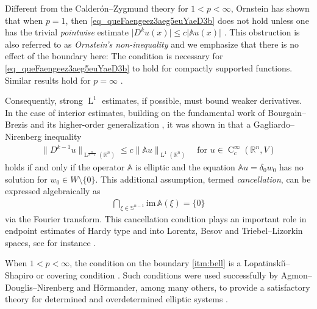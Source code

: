 \documentclass[a4paper,10pt]{amsart}
\newcommand{\R}{\mathbb R}
\renewcommand{\leq}{\leqslant}
\newcommand{\lebe}{\operatorname{L}}
\newcommand{\hold}{\operatorname{C}}
\newcommand{\A}{\mathbb{A}}
\numberwithin{equation}{section}
\theoremstyle{remark}
\numberwithin{equation}{section}
\begin{document}
	Different from the Calder\'{o}n--Zygmund theory  \cite{CalderonZygmund,CalderonZygmund1} for $1<p<\infty$, Ornstein has shown that when $p=1$, then \eqref{eq_queFaengeez3aeg5euYaeD3b} does  not hold unless one has the trivial \emph{pointwise} estimate \(\lvert D^k u (x)\rvert  \leq c \lvert \A u (x)\rvert\) \cite{Ornstein,KK,FG}. This obstruction is also referred to as \emph{Ornstein's non-inequality} and we  emphasize that there is no effect of the boundary here: The condition is necessary for \eqref{eq_queFaengeez3aeg5euYaeD3b} to hold for compactly supported functions. Similar results hold for $p=\infty$ \cite{Mityagin,dLM}.
	
	Consequently, strong $\lebe^1$ estimates, if possible, must bound weaker derivatives. In the case of interior estimates, building on the fundamental work of Bourgain--Brezis \cite{BB03,BB07,VS_div} and its higher-order generalization \cite{VS_jems}, it was shown in \cite{VS} that a Gagliardo--Nirenberg inequality
	\begin{align}\label{eq:VS}
		\|D^{k-1} u\|_{\lebe^{\frac{n}{n-1}}(\R^n)}\leq c\|\A u\|_{\lebe^1(\R^n)} \quad\text{for }u\in\hold^\infty_c(\R^n,V)
	\end{align}
	holds if and only if the operator $\A$ is elliptic and the equation $\A u=\delta_0w_0$ has no solution for $w_0\in W\setminus\{0\}$. This additional assumption, termed \emph{cancellation}, can be expressed algebraically as
	\begin{align}\tag{C}\label{eq:canc}
		\bigcap_{\xi\in\mathbb{S}^{n-1}}\mathrm{im\,}\A(\xi)=\{0\}
	\end{align}
	via the Fourier transform. This cancellation condition plays an important role in endpoint estimates of Hardy type and into Lorentz, Besov and Triebel--Lizorkin spaces, see for instance \cite{R_tams,R_CR,RS,SVS,HS,Stolyarov_Linfty,DieGm, Stolyarov,VS_pams}.
	
	When \(1 < p < \infty\), the condition on the boundary \ref{itm:bell} is a Lopatinski\u{\i}--Shapiro or covering condition \cite{Lopatinskii}. Such conditions were used successfully by Agmon--Douglis--Nirenberg and H\"ormander, among many others, to provide a satisfactory theory for determined and overdetermined elliptic systems \cite{ADN1,ADN2,Hormander}. 
	
\end{document}
